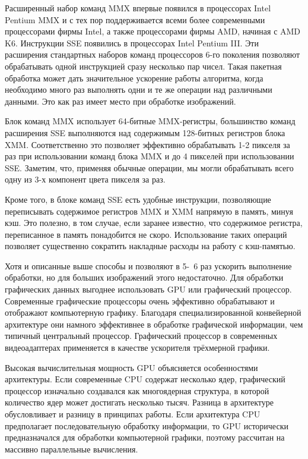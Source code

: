 Расширенный  набор  команд MMX впервые  появился  в  процессорах Intel Pentium 
MMX и с тех пор поддерживается всеми более современными процессорами фирмы Intel, 
а также процессорами фирмы AMD, начиная с AMD K6. Инструкции SSE появились 
в процессорах Intel Pentium III. Эти расширения стандартных наборов команд процессоров 
6-го поколения позволяют обрабатывать одной инструкцией сразу несколько пар чисел. 
Такая  пакетная  обработка  может  дать  значительное  ускорение  работы  алгоритма,  когда 
необходимо много раз выполнять одни и те же операции над различными данными. Это 
как раз имеет место при обработке изображений. 

Блок  команд MMX использует 64-битные MMX-регистры,  большинство  команд 
расширения SSE выполняются над содержимым 128-битных регистров блока XMM.  Соответственно это позволяет эффективно обрабатывать 1-2 пикселя за раз при использовании команд блока MMX и до 4 пикселей при использовании SSE. Заметим, что, применяя обычные операции, мы могли обрабатывать всего одну из 3-х компонент 
цвета пикселя за раз. 

Кроме того, в блоке команд SSE есть удобные инструкции, позволяющие переписывать содержимое регистров MMX и XMM напрямую в память, минуя кэш. Это полезно, в том случае, если заранее известно, что содержимое регистра, переписанное в память понадобится не скоро. Использование таких операций позволяет существенно сократить накладные расходы на работу с кэш-памятью.

Хотя и описанные выше способы и позволяют в 5\--~6 раз ускорить выполнение обработки, но для больших изображений этого недостаточно. Для обработки графических данных выгоднее использовать GPU или графический процессор. Современные графические процессоры очень эффективно обрабатывают и отображают компьютерную графику. Благодаря специализированной конвейерной архитектуре они намного эффективнее в обработке графической информации, чем типичный центральный процессор. Графический процессор в современных видеоадаптерах применяется в качестве ускорителя трёхмерной графики.

Высокая вычислительная мощность GPU объясняется особенностями архитектуры. Если современные CPU содержат несколько ядер, графический процессор изначально создавался как многоядерная структура, в которой количество ядер может достигать несколько тысяч. Разница в архитектуре обусловливает и разницу в принципах работы. Если архитектура CPU предполагает последовательную обработку информации, то GPU исторически предназначался для обработки компьютерной графики, поэтому рассчитан на массивно параллельные вычисления.

